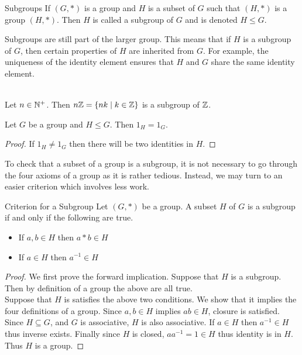 \documentclass[a4paper]{article}
\begin{document}
\begin{defn}{Subgroups}{} If $(G,\ast)$ is a group and $H$ is a subset of $G$ such that $(H,\ast)$ is a group $(H,\ast)$. Then $H$ is called a subgroup of $G$ and is denoted $H\leq G$. 
\end{defn}

Subgroups are still part of the larger group. This means that if $H$ is a subgroup of $G$, then certain properties of $H$ are inherited from $G$. For example, the uniqueness of the identity element ensures that $H$ and $G$ share the same identity element. 

\begin{eg}{}{}\\
Let $n\in\mathbb{N}^+$. Then $n\mathbb{Z}=\{nk\;|\;k\in\mathbb{Z}\}$ is a subgroup of $\mathbb{Z}$. 
\end{eg}

\begin{lmm}{}{} Let $G$ be a group and $H\leq G$. Then $1_H=1_G$. 
\begin{proof}
If $1_H\neq 1_G$ then there will be two identities in $H$. 
\end{proof}
\end{lmm}

To check that a subset of a group is a subgroup, it is not necessary to go through the four axioms of a group as it is rather tedious. Instead, we may turn to an easier criterion which involves less work. 

\begin{prp}{Criterion for a Subgroup}{} Let $(G,\ast)$ be a group. A subset $H$ of $G$ is a subgroup if and only if the following are true. 
\begin{itemize}
\item If $a,b\in H$ then $a\ast b\in H$
\item If $a\in H$ then $a^{-1}\in H$
\end{itemize}
\begin{proof} We first prove the forward implication. Suppose that $H$ is a subgroup. Then by definition of a group the above are all true.\\
Suppose that $H$ is satisfies the above two conditions. We show that it implies the four definitions of a group. Since $a,b\in H$ implies $ab\in H$, closure is satisfied. Since $H\subseteq G$, and $G$ is associative, $H$ is also associative. If $a\in H$ then $a^{-1}\in H$ thus inverse exists. Finally since $H$ is closed, $aa^{-1}=1\in H$ thus identity is in $H$. Thus $H$ is a group. 
\end{proof}
\end{prp}
\end{document}
